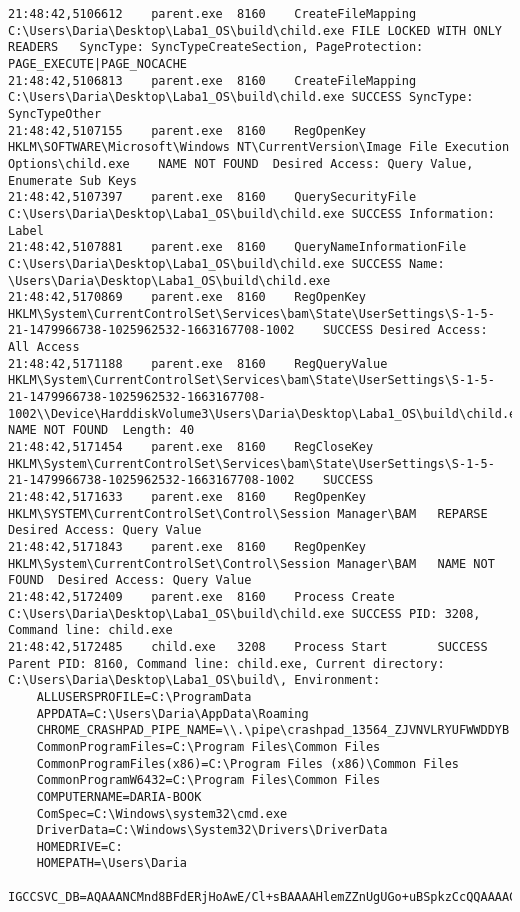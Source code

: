 \begin{verbatim}
21:48:42,5106612	parent.exe	8160	CreateFileMapping	C:\Users\Daria\Desktop\Laba1_OS\build\child.exe	FILE LOCKED WITH ONLY READERS	SyncType: SyncTypeCreateSection, PageProtection: PAGE_EXECUTE|PAGE_NOCACHE
21:48:42,5106813	parent.exe	8160	CreateFileMapping	C:\Users\Daria\Desktop\Laba1_OS\build\child.exe	SUCCESS	SyncType: SyncTypeOther
21:48:42,5107155	parent.exe	8160	RegOpenKey	HKLM\SOFTWARE\Microsoft\Windows NT\CurrentVersion\Image File Execution Options\child.exe	NAME NOT FOUND	Desired Access: Query Value, Enumerate Sub Keys
21:48:42,5107397	parent.exe	8160	QuerySecurityFile	C:\Users\Daria\Desktop\Laba1_OS\build\child.exe	SUCCESS	Information: Label
21:48:42,5107881	parent.exe	8160	QueryNameInformationFile	C:\Users\Daria\Desktop\Laba1_OS\build\child.exe	SUCCESS	Name: \Users\Daria\Desktop\Laba1_OS\build\child.exe
21:48:42,5170869	parent.exe	8160	RegOpenKey	HKLM\System\CurrentControlSet\Services\bam\State\UserSettings\S-1-5-21-1479966738-1025962532-1663167708-1002	SUCCESS	Desired Access: All Access
21:48:42,5171188	parent.exe	8160	RegQueryValue	HKLM\System\CurrentControlSet\Services\bam\State\UserSettings\S-1-5-21-1479966738-1025962532-1663167708-1002\\Device\HarddiskVolume3\Users\Daria\Desktop\Laba1_OS\build\child.exe	NAME NOT FOUND	Length: 40
21:48:42,5171454	parent.exe	8160	RegCloseKey	HKLM\System\CurrentControlSet\Services\bam\State\UserSettings\S-1-5-21-1479966738-1025962532-1663167708-1002	SUCCESS	
21:48:42,5171633	parent.exe	8160	RegOpenKey	HKLM\SYSTEM\CurrentControlSet\Control\Session Manager\BAM	REPARSE	Desired Access: Query Value
21:48:42,5171843	parent.exe	8160	RegOpenKey	HKLM\System\CurrentControlSet\Control\Session Manager\BAM	NAME NOT FOUND	Desired Access: Query Value
21:48:42,5172409	parent.exe	8160	Process Create	C:\Users\Daria\Desktop\Laba1_OS\build\child.exe	SUCCESS	PID: 3208, Command line: child.exe
21:48:42,5172485	child.exe	3208	Process Start		SUCCESS	Parent PID: 8160, Command line: child.exe, Current directory: C:\Users\Daria\Desktop\Laba1_OS\build\, Environment: 
	ALLUSERSPROFILE=C:\ProgramData
	APPDATA=C:\Users\Daria\AppData\Roaming
	CHROME_CRASHPAD_PIPE_NAME=\\.\pipe\crashpad_13564_ZJVNVLRYUFWWDDYB
	CommonProgramFiles=C:\Program Files\Common Files
	CommonProgramFiles(x86)=C:\Program Files (x86)\Common Files
	CommonProgramW6432=C:\Program Files\Common Files
	COMPUTERNAME=DARIA-BOOK
	ComSpec=C:\Windows\system32\cmd.exe
	DriverData=C:\Windows\System32\Drivers\DriverData
	HOMEDRIVE=C:
	HOMEPATH=\Users\Daria
	IGCCSVC_DB=AQAAANCMnd8BFdERjHoAwE/Cl+sBAAAAHlemZZnUgUGo+uBSpkzCcQQAAAACAAAAAAAQZgAAAAEAACAAAAAGheQ77iPmtc43Jm4IeZuELG1JqvCkCB+xVgAUP47whQAAAAAOgAAAAAIAACAAAABMj9+8TlLfQ9W9Iecl3nFZjp7KG8VmScGEjoZp5FsSDmAAAAAPLAvQM3/IJ389G+paEwtbgKxSYMa8X5GYroKqT700ZDqpz430Bq93FfKbqsoTUHnh0F7bZHZeJ/ctxClovmUxkEUOgew3boiOn40kkQia7HJCUhUDbNXJPKInj7Uv3J5AAAAAoAs5CSF+DXmMDAnu0Gbi6WrHyM/UqJP0Xl42SbQLNc03HBuPdccbOi5G9Z2SBbx5fFolIZlAdfwXXDcGn/LvDw==

\end{verbatim}

